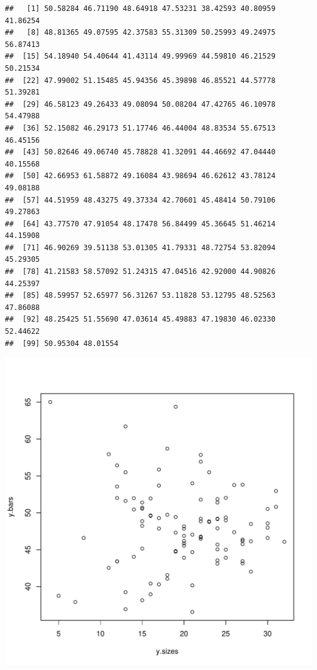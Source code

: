 \documentclass[12pt,letterpaper]{article}\usepackage[]{graphicx}\usepackage[]{color}
\makeatletter
\def\maxwidth{ %
  \ifdim\Gin@nat@width>\linewidth
    \linewidth
  \else
    \Gin@nat@width
  \fi
}
\newenvironment{kframe}{%
 \def\at@end@of@kframe{}%
 \ifinner\ifhmode%
  \def\at@end@of@kframe{\end{minipage}}%
  \begin{minipage}{\columnwidth}%
 \fi\fi%
 \def\FrameCommand##1{\hskip\@totalleftmargin \hskip-\fboxsep
 \colorbox{shadecolor}{##1}\hskip-\fboxsep
     \hskip-\linewidth \hskip-\@totalleftmargin \hskip\columnwidth}%
 \MakeFramed {\advance\hsize-\width
   \@totalleftmargin\z@ \linewidth\hsize
   \@setminipage}}%
 {\par\unskip\endMakeFramed%
 \at@end@of@kframe}
\newenvironment{knitrout}{}{} %
\makeatother
\begin{document}
\begin{knitrout}
\color{fgcolor}\begin{kframe}
\begin{verbatim}
##   [1] 50.58284 46.71190 48.64918 47.53231 38.42593 40.80959 41.86254
##   [8] 48.81365 49.07595 42.37583 55.31309 50.25993 49.24975 56.87413
##  [15] 54.18940 54.40644 41.43114 49.99969 44.59810 46.21529 50.21534
##  [22] 47.99002 51.15485 45.94356 45.39898 46.85521 44.57778 51.39281
##  [29] 46.58123 49.26433 49.08094 50.08204 47.42765 46.10978 54.47988
##  [36] 52.15082 46.29173 51.17746 46.44004 48.83534 55.67513 46.45156
##  [43] 50.82646 49.06740 45.78828 41.32091 44.46692 47.04440 40.15568
##  [50] 42.66953 61.58872 49.16084 43.98694 46.62612 43.78124 49.08188
##  [57] 44.51959 48.43275 49.37334 42.70601 45.48414 50.79106 49.27863
##  [64] 43.77570 47.91054 48.17478 56.84499 45.36645 51.46214 44.15908
##  [71] 46.90269 39.51138 53.01305 41.79331 48.72754 53.82094 45.29305
##  [78] 41.21583 58.57092 51.24315 47.04516 42.92000 44.90826 44.25397
##  [85] 48.59957 52.65977 56.31267 53.11828 53.12795 48.52563 47.86088
##  [92] 48.25425 51.55690 47.03614 45.49883 47.19830 46.02330 52.44622
##  [99] 50.95304 48.01554
\end{verbatim}
\end{kframe}
\includegraphics[width=\maxwidth]{figure/unnamed-chunk-2-1} 


\end{knitrout}
\end{document}
